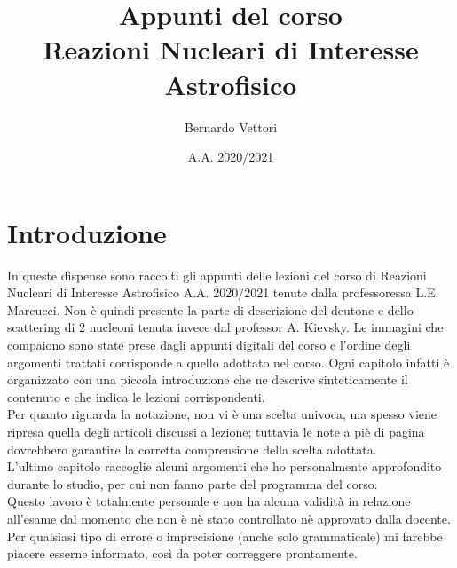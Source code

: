 \documentclass[12pt,a4paper,titlepage,openany]{book}
\title{Appunti del corso\\Reazioni Nucleari di Interesse Astrofisico}
\author{Bernardo Vettori}
\date{A.A. 2020/2021}
\begin{document}
\frontmatter
\maketitle
{}
\chapter*{Introduzione}
\noindent In queste dispense sono raccolti gli appunti delle lezioni del corso di Reazioni Nucleari di Interesse Astrofisico A.A. 2020/2021 tenute dalla professoressa L.E. Marcucci. Non è quindi presente la parte di descrizione del deutone e dello scattering di 2 nucleoni tenuta invece dal professor A. Kievsky. Le immagini che compaiono sono state prese dagli appunti digitali del corso e l'ordine degli argomenti trattati corrisponde a quello adottato nel corso. Ogni capitolo infatti è organizzato con una piccola introduzione che ne descrive sinteticamente il contenuto e che indica le lezioni corrispondenti.\\
Per quanto riguarda la notazione, non vi è una scelta univoca, ma spesso viene ripresa quella degli articoli discussi a lezione; tuttavia le note a piè di pagina dovrebbero garantire la corretta comprensione della scelta adottata.\\
L'ultimo capitolo \textit{} raccoglie alcuni argomenti che ho personalmente approfondito durante lo studio, per cui non fanno parte del programma del corso.\\
Questo lavoro è totalmente personale e non ha alcuna validità in relazione all'esame dal momento che non è nè stato controllato nè approvato dalla docente.
Per qualsiasi tipo di errore o imprecisione (anche solo grammaticale) mi farebbe piacere esserne informato, così da poter correggere prontamente.
\newpage
{}
\tableofcontents
\mainmatter
\end{document}
